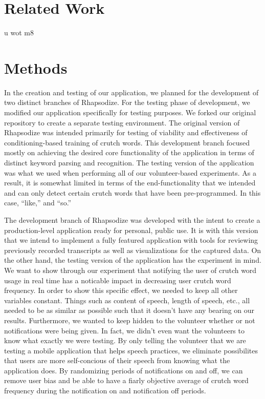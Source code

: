 \documentclass{sigchi}
\begin{document}
\section{Related Work}

u wot m8

\section{Methods}

In the creation and testing of our application, we planned for the development of two distinct branches of Rhapsodize. For the testing phase of development, we modified our application specifically for testing purposes. We forked our original repository to create a separate testing environment. The original version of Rhapsodize was intended primarily for testing of viability and effectiveness of conditioning-based training of crutch words. This development branch focused mostly on achieving the desired core functionality of the application in terms of distinct keyword parsing and recognition. The testing version of the application was what we used when performing all of our volunteer-based experiments. As a result, it is somewhat limited in terms of the end-functionality that we intended and can only detect certain crutch words that have been pre-programmed. In this case, ``like,'' and ``so.''

The development branch of Rhapsodize was developed with the intent to create a production-level application ready for personal, public use. It is with this version that we intend to implement a fully featured application with tools for reviewing previously recorded transcripts as well as visualizations for the captured data. On the other hand, the testing version of the application has the experiment in mind. We want to show through our experiment that notifying the user of crutch word usage in real time has a noticable impact in decreasing user crutch word frequency. In order to show this specific effect, we needed to keep all other variables constant. Things such as content of speech, length of speech, etc., all needed to be as similar as possible such that it doesn't have any bearing on our results. Furthermore, we wanted to keep hidden to the volunteer whether or not notifications were being given. In fact, we didn't even want the volunteers to know what exactly we were testing. By only telling the volunteer that we are testing a mobile application that helps speech practices, we eliminate possibilites that users are more self-concious of their speech from knowing what the application does. By randomizing periods of notifications on and off, we can remove user bias and be able to have a fiarly objective average of crutch word frequency during the notification on and notification off periods.
\end{document}
